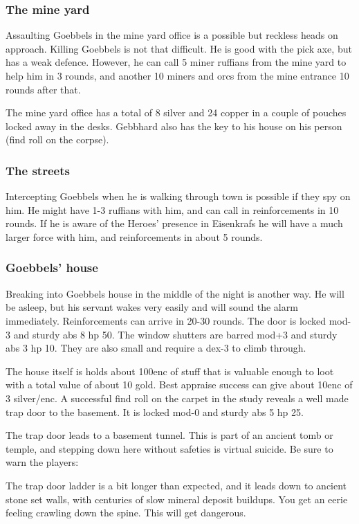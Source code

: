\subsubsection*{The mine yard}
Assaulting Goebbels in the mine yard office is a possible but reckless heads on approach. Killing Goebbels is not that difficult. He is good with the pick axe, but has a weak defence. However, he can call 5 miner ruffians from the mine yard to help him in 3 rounds, and another 10 miners and orcs from the mine entrance 10 rounds after that.

The mine yard office has a total of 8 silver and 24 copper in a couple of pouches locked away in the desks.
Gebbhard also has the key to his house on his person (find roll on the corpse).


\subsubsection*{The streets}
Intercepting Goebbels when he is walking through town is possible if they spy on him. He might have 1-3 ruffians with him, and can call in reinforcements in 10 rounds. If he is aware of the Heroes' presence in Eisenkrafs he will have a much larger force with him, and reinforcements in about 5 rounds.


\subsubsection*{Goebbels' house}
Breaking into Goebbels house in the middle of the night is another way. He will be asleep, but his servant wakes very easily and will sound the alarm immediately. Reinforcements can arrive in 20-30 rounds.
The door is locked mod-3 and sturdy abs 8 hp 50. The window shutters are barred mod+3 and sturdy abs 3 hp 10. They are also small and require a dex-3 to climb through.

The house itself is holds about 100enc of stuff that is valuable enough to loot with a total value of about 10 gold. Best appraise success can give about 10enc of 3 silver/enc.
A successful find roll on the carpet in the study reveals a well made trap door to the basement. It is locked mod-0 and sturdy abs 5 hp 25.

The trap door leads to a basement tunnel. This is part of an ancient tomb or temple, and stepping down here without safeties is virtual suicide. Be sure to warn the players:
\begin{readoutloud}
The trap door ladder is a bit longer than expected, and it leads down to ancient stone set walls, with centuries of slow mineral deposit buildups. You get an eerie feeling crawling down the spine. This will get dangerous.
\end{readoutloud}

